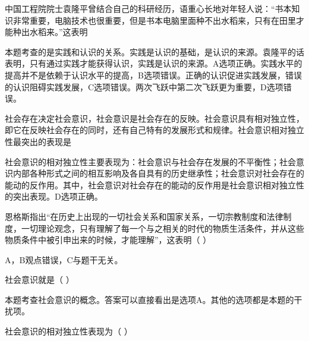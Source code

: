 \question 中国工程院院士袁隆平曾结合自己的科研经历，语重心长地对年轻人说：``书本知识非常重要，电脑技术也很重要，但是书本电脑里面种不出水稻来，只有在田里才能种出水稻来。''这表明
\par{}
\begin{solution}本题考查的是实践和认识的关系。实践是认识的基础，是认识的来源。袁隆平的话表明，只有通过实践才能获得认识，实践是认识的来源。A选项正确。实践水平的提高并不是依赖于认识水平的提高，B选项错误。正确的认识促进实践发展，错误的认识阻碍实践发展，C选项错误。两次飞跃中第二次飞跃更为重要，D选项错误。
\end{solution}
\question 社会存在决定社会意识，社会意识是社会存在的反映。社会意识具有相对独立性，即它在反映社会存在的同时，还有自己特有的发展形式和规律。社会意识相对独立性最突出的表现是
\par{}
\begin{solution}社会意识的相对独立性主要表现为：社会意识与社会存在发展的不平衡性；社会意识内部各种形式之间的相互影响及各自具有的历史继承性；社会意识对社会存在的能动的反作用。其中，社会意识对社会存在的能动的反作用是社会意识相对独立性的突出表现。D选项正确。
\end{solution}
\question 恩格斯指出``在历史上出现的一切社会关系和国家关系，一切宗教制度和法律制度，一切理论观念，只有理解了每一个与之相关的时代的物质生活条件，并从这些物质条件中被引申出来的时候，才能理解''，这表明（
）
\par{}
\begin{solution}A，B观点错误，C与题干无关。
\end{solution}
\question 社会意识就是（ ）
\par{}
\begin{solution}本题考查社会意识的概念。答案可以直接看出是选项A。其他的选项都是本题的干扰项。
\end{solution}
\question 社会意识的相对独立性表现为（ ）
\par\fourch{\textcolor{red}{社会意识与社会存在发展的不平衡性、不同步性}}{\textcolor{red}{社会意识对社会存在的能动的反作用}}{\textcolor{red}{社会意识具有历史继承性}}{\textcolor{red}{各种社会意识形式之间的相互影响}}
